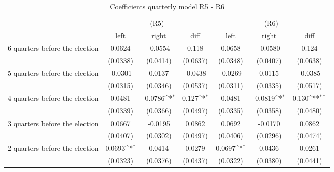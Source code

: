 \begin{table}[!ht]\centering \footnotesize
\def\sym#1{\ifmmode^{#1}\else\(^{#1}\)\fi}
\caption{Coefficients quarterly model R5 - R6}
\begin{tabular}{l*{6}{c}}
\hline\hline
                     &\multicolumn{3}{c}{(R5)}&\multicolumn{3}{c}{(R6)}\\
 &\multicolumn{1}{c}{left}&\multicolumn{1}{c}{right}&\multicolumn{1}{c}{diff}&\multicolumn{1}{c}{left}&\multicolumn{1}{c}{right}&\multicolumn{1}{c}{diff}\\
 \hline
 6 quarters before the election&      0.0624         &     -0.0554         &       0.118         &      0.0658         &     -0.0580         &       0.124         \\
                    &    (0.0338)         &    (0.0414)         &    (0.0637)         &    (0.0348)         &    (0.0407)         &    (0.0638)         \\
[0.5em]
 5 quarters before the election&     -0.0301         &      0.0137         &     -0.0438         &     -0.0269         &      0.0115         &     -0.0385         \\
                    &    (0.0315)         &    (0.0346)         &    (0.0537)         &    (0.0311)         &    (0.0335)         &    (0.0517)         \\
[0.5em]
 4 quarters before the election&      0.0481         &     -0.0786\sym{*}  &       0.127\sym{*}  &      0.0481         &     -0.0819\sym{*}  &       0.130\sym{**} \\
                    &    (0.0339)         &    (0.0366)         &    (0.0497)         &    (0.0335)         &    (0.0358)         &    (0.0480)         \\
[0.5em]
 3 quarters before the election&      0.0667         &     -0.0195         &      0.0862         &      0.0692         &     -0.0170         &      0.0862         \\
                    &    (0.0407)         &    (0.0302)         &    (0.0497)         &    (0.0406)         &    (0.0296)         &    (0.0474)         \\
[0.5em]
 2 quarters before the election&      0.0693\sym{*}  &      0.0414         &      0.0279         &      0.0697\sym{*}  &      0.0436         &      0.0261         \\
                    &    (0.0323)         &    (0.0376)         &    (0.0437)         &    (0.0322)         &    (0.0380)         &    (0.0441)         \\

\end{tabular}
\end{table}
